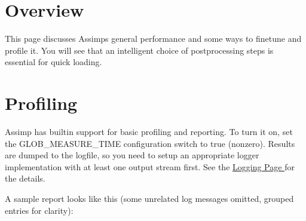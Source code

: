 \hypertarget{perf_perf_overview}{}\section{Overview}\label{perf_perf_overview}
This page discusses Assimps general performance and some ways to finetune and profile it. You will see that an intelligent choice of postprocessing steps is essential for quick loading.\hypertarget{perf_perf_profile}{}\section{Profiling}\label{perf_perf_profile}
Assimp has builtin support for basic profiling and reporting. To turn it on, set the {\ttfamily G\+L\+O\+B\+\_\+\+M\+E\+A\+S\+U\+R\+E\+\_\+\+T\+I\+M\+E} configuration switch to {\ttfamily true} (nonzero). Results are dumped to the logfile, so you need to setup an appropriate logger implementation with at least one output stream first. See the \hyperlink{usage_logging}{Logging Page } for the details.

A sample report looks like this (some unrelated log messages omitted, grouped entries for clarity)\+:

